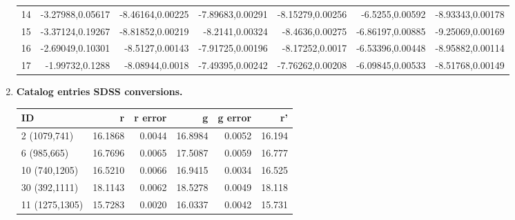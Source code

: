 \documentclass{article}
\begin{document}
\begin{enumerate}
\begin{table} [h]
\begin{tabular} {l r r r r r r}
				14 & -3.27988,0.05617 & -8.46164,0.00225 & -7.89683,0.00291 & -8.15279,0.00256 & -6.5255,0.00592 & -8.93343,0.00178 \\
				15 & -3.37124,0.19267 & -8.81852,0.00219 & -8.2141,0.00324 & -8.4636,0.00275 & -6.86197,0.00885 & -9.25069,0.00169 \\
				16 & -2.69049,0.10301 & -8.5127,0.00143 & -7.91725,0.00196 & -8.17252,0.0017 & -6.53396,0.00448 & -8.95882,0.00114 \\
				17 & -1.99732,0.1288 & -8.08944,0.0018 & -7.49395,0.00242 & -7.76262,0.00208 & -6.09845,0.00533 & -8.51768,0.00149 \\
				\bottomrule
			\end{tabular}
		\end{table}
	
		\item \textbf{Catalog entries SDSS conversions.}
		\begin{table} [h]
			\centering
			\begin{tabular} {l r r r r r}
				\toprule
				\textbf{ID} & \textbf{r} & \textbf{r error} & \textbf{g} & \textbf{g error} & \textbf{r'} \\
				\midrule
				2 (1079,741) & 16.1868 & 0.0044 & 16.8984 & 0.0052 & 16.194 \\
				6 (985,665) & 16.7696 & 0.0065 & 17.5087 & 0.0059 & 16.777 \\
				10 (740,1205) & 16.5210 & 0.0066 & 16.9415 & 0.0034 & 16.525 \\
				30 (392,1111) & 18.1143 & 0.0062 & 18.5278 & 0.0049 & 18.118\\
				11 (1275,1305) & 15.7283 & 0.0020 & 16.0337 & 0.0042 & 15.731 \\
				\bottomrule
			\end{tabular}
		\end{table}
	

\end{enumerate}
\end{document}
